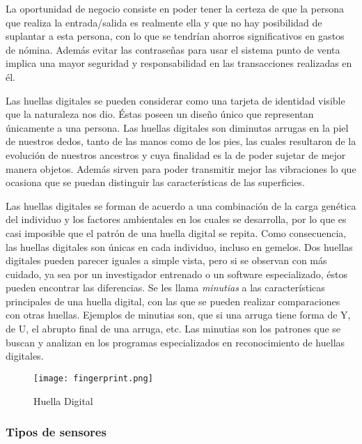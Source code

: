 La oportunidad de negocio consiste en poder tener la certeza de que la persona que realiza la entrada/salida es realmente ella y que no hay posibilidad de suplantar a esta persona, con lo que se tendrían ahorros significativos en gastos de nómina. Además evitar las contraseñas para usar el sistema punto de venta implica una mayor seguridad y responsabilidad en las transacciones realizadas en él.

Las huellas digitales se pueden considerar como una tarjeta de identidad visible que la naturaleza nos dio. Éstas poseen un diseño único que representan únicamente a una persona. Las huellas digitales son diminutas arrugas en la piel de nuestros dedos, tanto de las manos como de los pies, las cuales resultaron de la evolución de nuestros ancestros y cuya finalidad es la de poder sujetar de mejor manera objetos. Además sirven para poder transmitir mejor las vibraciones lo que ocasiona que se puedan distinguir las características de las superficies.

Las huellas digitales se forman de acuerdo a una combinación de la carga genética del individuo y los factores ambientales en los cuales se desarrolla, por lo que es casi imposible que el patrón de una huella digital se repita. Como consecuencia, las huellas digitales son únicas en cada individuo, incluso en gemelos. Dos huellas digitales pueden parecer iguales a simple vista, pero si se observan con más cuidado, ya sea por un investigador entrenado o un software especializado, éstos pueden encontrar las diferencias. Se les llama \textit{minutias} a las características principales de una huella digital, con las que se pueden realizar comparaciones con otras huellas. Ejemplos de minutias son, que si una arruga tiene forma de Y, de U, el abrupto final de una arruga, etc. Las minutias son los patrones que se buscan y analizan en los programas especializados en reconocimiento de huellas digitales.

\begin{figure}[htb]
 \begin{center}
  \texttt{[image: fingerprint.png]}
 \end{center}
 \caption{Huella Digital}
 \label{fig:finger_print_1}
\end{figure}


\subsubsection{Tipos de sensores}
\label{sec:fp_sensores}


